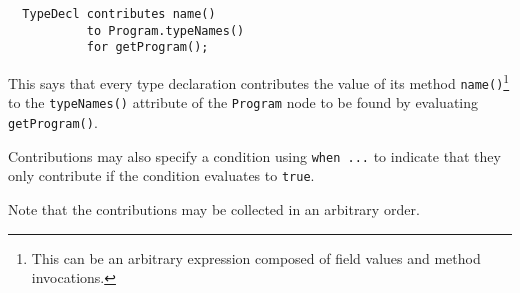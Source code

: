 \documentclass{article}
\newcommand{\nt}[1]{\texttt{#1}}
\newcommand{\code}[1]{\lstinline$#1$}
\begin{document}
\begin{lstlisting}
  TypeDecl contributes name()
           to Program.typeNames()
           for getProgram();
\end{lstlisting}

This says that every type declaration contributes the value of its method \code{name()}\footnote{This can be an arbitrary expression composed of field values and method invocations.} to the \code{typeNames()} attribute of the \nt{Program} node to be found by evaluating \code{getProgram()}.

Contributions may also specify a condition using \code{when ...} to indicate that they only contribute if the condition evaluates to \code{true}.

Note that the contributions may be collected in an arbitrary order.
\end{document}

